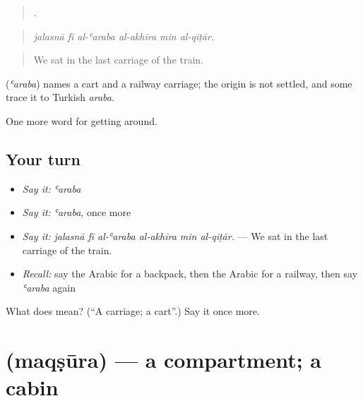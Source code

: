 \begin{quote}
     .
\end{quote}

\begin{quote}
\emph{jalasnā fī al-ʿaraba al-akhīra min al-qiṭār.}
\end{quote}

\begin{quote}
We sat in the last carriage of the train.
\end{quote}

\begin{cousinweb}
\textbf{} (\emph{ʿaraba}) names a cart and a railway carriage; the origin is not settled, and some trace it to Turkish \emph{araba}.
\end{cousinweb}

\begin{grammarlens}[title={What you've built}]
One more word for getting around.
\end{grammarlens}

\subsection*{Your turn}
\begin{itemize}
\raggedright
  \item \emph{Say it:} \emph{ʿaraba}
  \item \emph{Say it:} \emph{ʿaraba}, once more
  \item \emph{Say it:} \emph{jalasnā fī al-ʿaraba al-akhīra min al-qiṭār.} — We sat in the last carriage of the train.
  \item \emph{Recall:} say the Arabic for a backpack, then the Arabic for a railway, then say \emph{ʿaraba} again
\end{itemize}

\begin{tcolorbox}[breakable,colback=teal!4,colframe=teal!35!black,title={Before you move on}]
What does  mean? (\textquotedblleft{}A carriage; a cart\textquotedblright{}.) Say it once more.
\end{tcolorbox}
\section[\texorpdfstring{\ar{مقصورة} (maqṣūra)}{مقصورة (maqṣūra)}]{ (maqṣūra) — a compartment; a cabin}

\label{lesson:AR-C428-maqsura}




